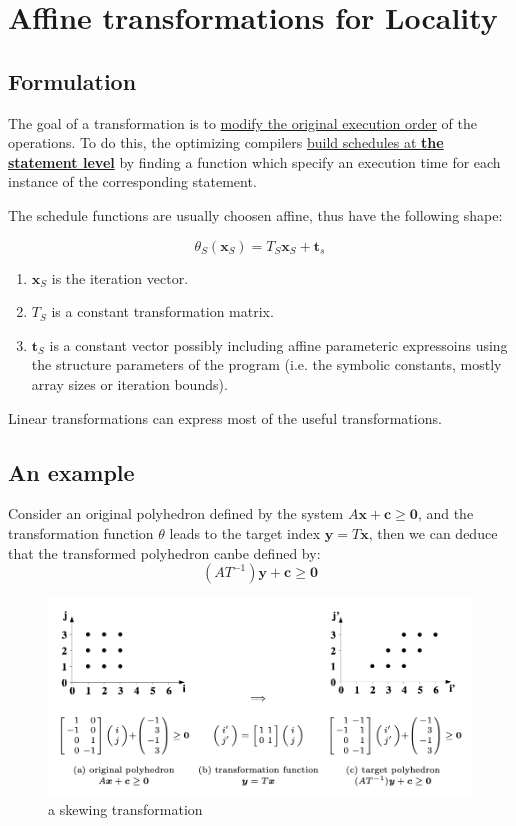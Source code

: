 \section{Affine transformations for Locality}

\subsection{Formulation}

The goal of a transformation is to \underline{modify the original execution order}
of the operations. To do this, the optimizing compilers \underline{build schedules
at \textbf{the statement level}} by finding a function which specify an execution time
for each instance of the corresponding statement.

The schedule functions are usually choosen affine, thus have the following shape:

\begin{equation}
\theta_S(\bm{x}_S) = T_S\bm{x}_S + \bm{t}_s
\end{equation}

\begin{enumerate}
  \item $\bm{x}_S$ is the iteration vector.
  \item $T_S$ is a constant transformation matrix.
  \item $\bm{t}_S$ is a constant vector possibly including affine parameteric expressoins
  using the structure parameters of the program (i.e. the symbolic constants, mostly
  array sizes or iteration bounds).
\end{enumerate}

Linear transformations can express most of the useful transformations.

\subsection{An example}

Consider an original polyhedron defined by the system $A\bm{x} + \bm{c} \ge \bm{0}$,
and the transformation function $\theta$ leads to the target index $\bm{y} = T\bm{x}$,
then we can deduce that the transformed polyhedron canbe defined by:
$$\left(AT^{-1}\right)\bm{y} + \bm{c}\ge \bm{0}$$

\begin{figure}[ht]
  \centering
  \includegraphics[scale=0.45]{images/a_skewing_transformation.png}
  \caption{a skewing transformation}
\end{figure}

